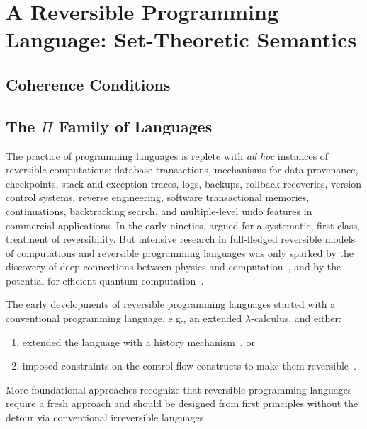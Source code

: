 \section{A Reversible Programming Language: Set-Theoretic Semantics}
\label{sec:reversibleone}
\label{sec:reversibletwo}
\label{langeqeq}
\label{sec:informal}

\subsection{Coherence Conditions}


\subsection{The $\Pi$ Family of Languages}


The practice of programming languages is replete with \emph{ad hoc} instances of reversible computations: database
transactions, mechanisms for data provenance, checkpoints, stack and exception traces, logs, backups, rollback
recoveries, version control systems, reverse engineering, software transactional memories, continuations, backtracking
search, and multiple-level undo features in commercial applications. In the early nineties,
\citet{Baker:1992:LLL,Baker:1992:NFT} argued for a systematic, first-class, treatment of reversibility. But intensive
research in full-fledged reversible models of computations and reversible programming languages was only sparked by the
discovery of deep connections between physics and
computation~\cite{Landauer:1961,PhysRevA.32.3266,Toffoli:1980,bennett1985fundamental,Frank:1999:REC:930275, Hey:1999:FCE:304763,fredkin1982conservative}, and by the
potential for efficient quantum computation~\cite{springerlink:10.1007/BF02650179}.

The early developments of reversible programming languages started
with a conventional programming language, e.g., an extended
$\lambda$-calculus, and either:
\begin{enumerate}
  \item extended the language with a history
        mechanism~\cite{vanTonder:2004,Kluge:1999:SEMCD,lorenz,danos2004reversible}, or
  \item imposed constraints on the control flow constructs to make them
        reversible~\cite{Yokoyama:2007:RPL:1244381.1244404}.
\end{enumerate}
More foundational approaches recognize that reversible programming languages require a fresh approach and should be
designed from first principles without the detour via conventional irreversible
languages~\cite{Yokoyama:2008:PRP,Mu:2004:ILRC,abramsky2005structural,DiPierro:2006:RCL:1166042.1166047,
  rc2011,James:2012:IE:2103656.2103667,Carette2016}.

